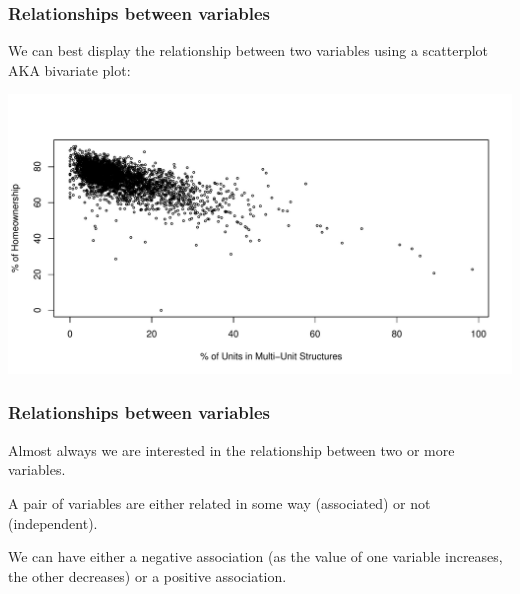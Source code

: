 \documentclass[slides]{beamer}
\newcommand{\blue}[1]{\textcolor{blue2}{#1}}
\begin{document}
\begin{frame}[fragile]
\frametitle{Relationships between variables}
We can best display the relationship between two variables using a \blue{scatterplot AKA bivariate plot}:

\begin{center}
\pause\includegraphics[width=\linewidth]{figure/relationships} 
\end{center}

\end{frame}


\begin{frame}
\frametitle{Relationships between variables}
Almost always we are interested in the relationship between two or more variables.

\vspace{0.25cm}

\pause A pair of variables are either related in some way (\blue{associated}) or not (\blue{independent}).

\vspace{0.25cm}

\pause We can have either a \blue{negative association} (as the value of one variable increases, the other decreases) or a \blue{positive association}.

\end{frame}
\end{document}
